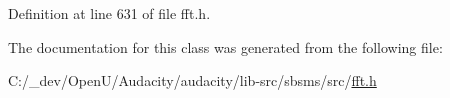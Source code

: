 Definition at line 631 of file fft.\+h.



The documentation for this class was generated from the following file\+:\begin{DoxyCompactItemize}
\item 
C\+:/\+\_\+dev/\+Open\+U/\+Audacity/audacity/lib-\/src/sbsms/src/\hyperlink{lib-src_2sbsms_2src_2fft_8h}{fft.\+h}\end{DoxyCompactItemize}
